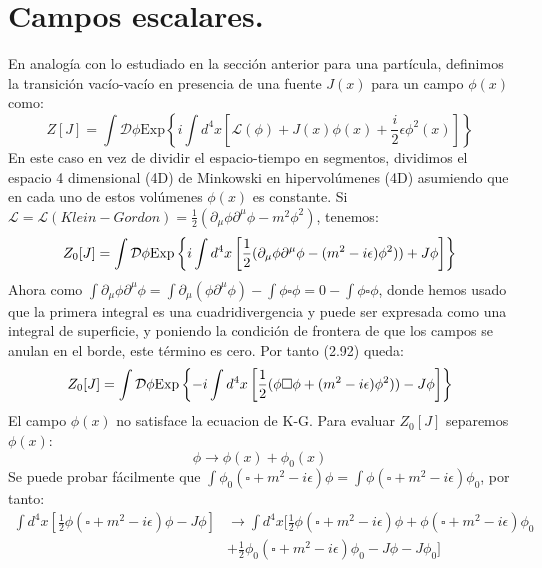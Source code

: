 \section{Campos escalares.}
En analogía con lo estudiado en la sección anterior para una partícula, definimos la transición vacío-vacío en presencia de una fuente $J(x)$ para un campo $\phi(x)$ como:
\begin{equation}
Z[J]=\int\mathcal{D}\phi\text{Exp}\left\{ i\int d^{4}x\left[\mathcal{L}(\phi)+J(x)\phi(x)+\frac{i}{2}\epsilon\phi^{2}(x)\right]\right\}
\end{equation}
En este caso en vez de dividir el espacio-tiempo en segmentos, dividimos el espacio 4 dimensional (4D) de Minkowski en hipervolúmenes (4D) asumiendo que en cada uno de estos volúmenes $\phi(x)$ es constante. Si $\mathcal{L}=\mathcal{L}(Klein-Gordon)=\frac{1}{2}(\partial_\mu\phi\partial^\mu\phi-m^2 \phi^2)$, tenemos:
\begin{equation}
Z_{0}[J]=\text{\ensuremath{\int\mathcal{D}}}\phi\text{Exp}\left\{ i\int d^{4}x\left[\frac{1}{2}(\partial_{\mu}\phi\partial^{\mu}\phi-(m^{2}-i\epsilon)\phi^{2}))+J\phi\right]\right\} 
\end{equation} 	
Ahora como $\int\partial_{\mu}\phi\partial^{\mu}\phi=\int\partial_{\mu}(\phi\partial^{\mu}\phi)-\int\phi\square\phi=0-\int\phi\square\phi$, donde hemos usado que la primera integral es una cuadridivergencia y puede ser expresada como una integral de superficie, y poniendo la condición de frontera de que los campos se anulan en el borde, este término es cero. Por tanto (2.92) queda:
\begin{equation}
Z_{0}[J]=\text{\ensuremath{\int\mathcal{D}}}\phi\text{Exp}\left\{ -i\int d^{4}x\left[\frac{1}{2}(\phi\square\phi+(m^{2}-i\epsilon)\phi^{2}))-J\phi\right]\right\} 
\end{equation}
El campo $\phi(x)$ no satisface la ecuacion de K-G. Para evaluar $Z_0[J]$ separemos $\phi(x)$:
\begin{equation}
\phi \rightarrow \phi(x)+\phi_0(x)
\end{equation}
Se puede probar fácilmente que $\int\phi_{0}(\square+m^{2}-i\epsilon)\phi=\int\phi(\square+m^{2}-i\epsilon)\phi_{0}$, por tanto:
\begin{eqnarray}
\nonumber \int d^{4}x\left[\frac{1}{2}\phi(\square+m^{2}-i\epsilon)\phi-J\phi\right]&\rightarrow\int d^{4}x[\frac{1}{2}\phi(\square+m^{2}-i\epsilon)\phi+\phi(\square+m^{2}-i\epsilon)\phi_{0}\\
&+\frac{1}{2}\phi_{0}(\square+m^{2}-i\epsilon)\phi_{0}-J\phi-J\phi_{0}]
\end{eqnarray}
